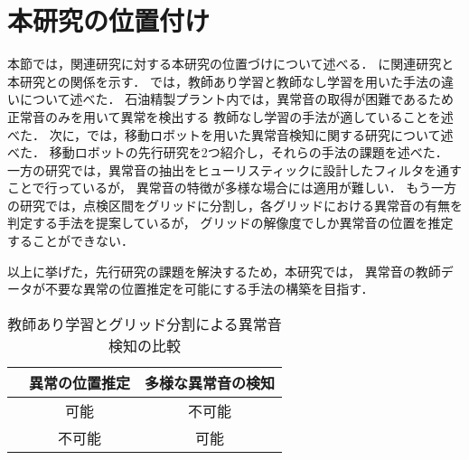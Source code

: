 \documentclass[../main]{subfiles}
\begin{document}
\section{本研究の位置付け}
\label{sec:related_work_summary}

本節では，関連研究に対する本研究の位置づけについて述べる．
に関連研究と本研究との関係を示す．
では，教師あり学習と教師なし学習を用いた手法の違いについて述べた．
石油精製プラント内では，異常音の取得が困難であるため正常音のみを用いて異常を検出する
教師なし学習の手法が適していることを述べた．
次に，では，移動ロボットを用いた異常音検知に関する研究について述べた．
移動ロボットの先行研究を2つ紹介し，それらの手法の課題を述べた．
一方の研究では，異常音の抽出をヒューリスティックに設計したフィルタを通すことで行っているが，
異常音の特徴が多様な場合には適用が難しい．
もう一方の研究では，点検区間をグリッドに分割し，各グリッドにおける異常音の有無を判定する手法を提案しているが，
グリッドの解像度でしか異常音の位置を推定することができない．

以上に挙げた，先行研究の課題を解決するため，本研究では，
異常音の教師データが不要な異常の位置推定を可能にする手法の構築を目指す．

\begin{table}[htbp]
  \centering
  \caption{教師あり学習とグリッド分割による異常音検知の比較}
  \label{tab:comparison}
  \begin{tabular}{|c|c|c|}
  \hline
   & 異常の位置推定 & 多様な異常音の検知 \\ \hline
  \cite{9023943} & 可能 & 不可能 \\ \hline
  \cite{10202270} & 不可能 & 可能 \\ \hline
  \end{tabular}
\end{table}
\end{document}
